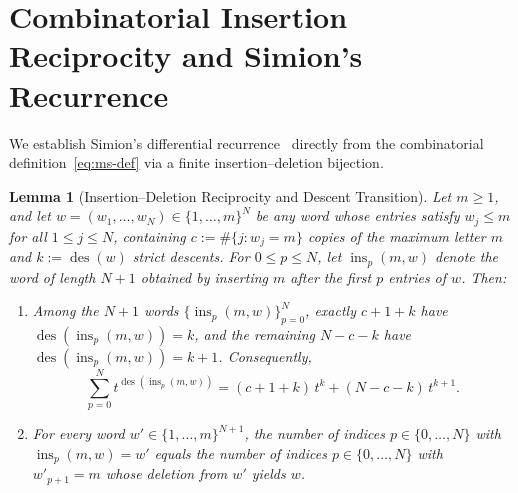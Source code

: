 \documentclass[11pt]{article}
\newtheorem{lemma}[theorem]{Lemma}
\theoremstyle{definition}
\newcommand{\des}{\operatorname{des}}
\begin{document}
\section{Combinatorial Insertion Reciprocity and Simion's Recurrence}

We establish Simion's differential recurrence~\cite{Simion1984} directly from the
combinatorial definition~\eqref{eq:ms-def} via a finite insertion--deletion bijection.

\begin{lemma}[Insertion--Deletion Reciprocity and Descent Transition]\label{lem:insertion}
Let $m \ge 1$, and let $w = (w_1,\dots,w_N) \in \{1,\dots,m\}^N$ be any word whose entries
satisfy $w_j \le m$ for all $1 \le j \le N$, containing $c := \#\{j : w_j = m\}$ copies of
the maximum letter $m$ and $k := \des(w)$ strict descents. For $0 \le p \le N$, let
$\operatorname{ins}_p(m, w)$ denote the word of length $N+1$ obtained by inserting $m$ after
the first $p$ entries of $w$. Then:
\begin{enumerate}
  \item Among the $N+1$ words $\{\operatorname{ins}_p(m,w)\}_{p=0}^N$, exactly $c + 1 + k$
  have $\des(\operatorname{ins}_p(m,w)) = k$, and the remaining $N - c - k$ have
  $\des(\operatorname{ins}_p(m,w)) = k + 1$. Consequently,
  \begin{equation}\label{eq:word-sum}
    \sum_{p=0}^{N} t^{\des(\operatorname{ins}_p(m,w))}
    = (c + 1 + k)\,t^k + (N - c - k)\,t^{k+1}.
  \end{equation}
  \item For every word $w' \in \{1,\dots,m\}^{N+1}$, the number of indices $p \in \{0,\dots,N\}$
  with $\operatorname{ins}_p(m,w) = w'$ equals the number of indices $p \in \{0,\dots,N\}$
  with $w'_{p+1} = m$ whose deletion from $w'$ yields $w$.
\end{enumerate}
\end{lemma}
\end{document}
